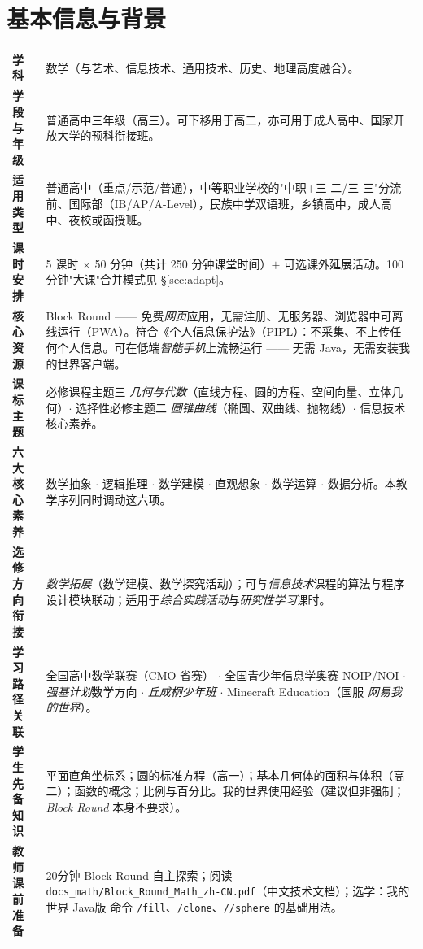 \documentclass[12pt,a4paper]{scrartcl}
\newcommand{\cmd}[1]{\textcolor{earth}{\texttt{\small #1}}}
\begin{document}
\renewcommand{\contentsname}{\color{accent}目录}
\tableofcontents
\thispagestyle{fancy}
\newpage

\section{基本信息与背景}\label{sec:identificacao}

\begin{center}
\begin{tabular}{@{}p{}p{}@{}}
\toprule
\textbf{学科} & 数学（与艺术、信息技术、通用技术、历史、地理高度融合）。\\
\addlinespace[2pt]
\textbf{学段与年级} & 普通高中三年级（高三）。可下移用于高二，亦可用于成人高中、国家开放大学的预科衔接班。\\
\addlinespace[2pt]
\textbf{适用类型} & 普通高中（重点/示范/普通），中等职业学校的"中职+三 二/三 三"分流前、国际部（IB/AP/A-Level），民族中学双语班，乡镇高中，成人高中、夜校或函授班。\\
\addlinespace[2pt]
\textbf{课时安排} & 5 课时 $\times$ 50 分钟（共计 250 分钟课堂时间）$+$ 可选课外延展活动。100 分钟"大课"合并模式见 §\ref{sec:adapt}。\\
\addlinespace[2pt]
\textbf{核心资源} & Block Round —— 免费\emph{网页}应用，无需注册、无服务器、浏览器中可离线运行（PWA）。符合《个人信息保护法》（PIPL）：不采集、不上传任何个人信息。可在低端\emph{智能手机}上流畅运行 —— 无需 Java，无需安装我的世界客户端。\\
\addlinespace[2pt]
\textbf{课标主题} & 必修课程主题三 \emph{几何与代数}（直线方程、圆的方程、空间向量、立体几何）$\cdot$ 选择性必修主题二 \emph{圆锥曲线}（椭圆、双曲线、抛物线）$\cdot$ 信息技术核心素养。\\
\addlinespace[2pt]
\textbf{六大核心素养} & 数学抽象 $\cdot$ 逻辑推理 $\cdot$ 数学建模 $\cdot$ 直观想象 $\cdot$ 数学运算 $\cdot$ 数据分析。本教学序列同时调动这六项。\\
\addlinespace[2pt]
\textbf{选修方向衔接} & \emph{数学拓展}（数学建模、数学探究活动）；可与\emph{信息技术}课程的算法与程序设计模块联动；适用于\emph{综合实践活动}与\emph{研究性学习}课时。\\
\addlinespace[2pt]
\textbf{学习路径关联} & \hyperref[sec:obmep]{全国高中数学联赛}（CMO 省赛） $\cdot$ 全国青少年信息学奥赛 NOIP/NOI $\cdot$ \emph{强基计划}数学方向 $\cdot$ \emph{丘成桐少年班} $\cdot$ Minecraft Education（国服 \emph{网易我的世界}）。\\
\addlinespace[2pt]
\textbf{学生先备知识} & 平面直角坐标系；圆的标准方程（高一）；基本几何体的面积与体积（高二）；函数的概念；比例与百分比。我的世界使用经验（建议但非强制；\emph{Block Round} 本身不要求）。\\
\addlinespace[2pt]
\textbf{教师课前准备} & 20分钟 Block Round 自主探索；阅读 \texttt{docs\_math/Block\_Round\_Math\_zh-CN.pdf}（中文技术文档）；选学：我的世界 Java版 命令 \cmd{/fill}、\cmd{/clone}、\cmd{//sphere} 的基础用法。\\
\bottomrule
\end{tabular}
\end{center}
\end{document}
